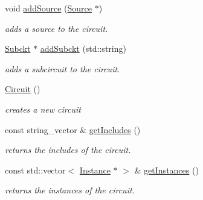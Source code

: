 \begin{DoxyCompactItemize}
void \mbox{\hyperlink{class_s_p_i_c_e_1_1_circuit_a627cf18c2763bb59f3d7e5142873251c}{add\+Source}} (\mbox{\hyperlink{class_s_p_i_c_e_1_1_source}{Source}} $\ast$)
\begin{DoxyCompactList}\small\item\em adds a source to the circuit. \end{DoxyCompactList}\item 
\mbox{\hyperlink{class_s_p_i_c_e_1_1_subckt}{Subckt}} $\ast$ \mbox{\hyperlink{class_s_p_i_c_e_1_1_circuit_a0d1352e46d4537ce1e5f651de40e91a6}{add\+Subckt}} (std\+::string)
\begin{DoxyCompactList}\small\item\em adds a subcircuit to the circuit. \end{DoxyCompactList}\item 
\mbox{\label{class_s_p_i_c_e_1_1_circuit_a2210ebc37eee536dbe9b44a89690256c}} 
\mbox{\hyperlink{class_s_p_i_c_e_1_1_circuit_a2210ebc37eee536dbe9b44a89690256c}{Circuit}} ()
\begin{DoxyCompactList}\small\item\em creates a new circuit \end{DoxyCompactList}\item 
\mbox{\label{class_s_p_i_c_e_1_1_circuit_a312beaf640e84589e6644820355c8ed6}} 
const string\+\_\+vector \& \mbox{\hyperlink{class_s_p_i_c_e_1_1_circuit_a312beaf640e84589e6644820355c8ed6}{get\+Includes}} ()
\begin{DoxyCompactList}\small\item\em returns the includes of the circuit. \end{DoxyCompactList}\item 
\mbox{\label{class_s_p_i_c_e_1_1_circuit_a8e6e58ffab876152a740092520c35d73}} 
const std\+::vector$<$ \mbox{\hyperlink{class_s_p_i_c_e_1_1_instance}{Instance}} $\ast$ $>$ \& \mbox{\hyperlink{class_s_p_i_c_e_1_1_circuit_a8e6e58ffab876152a740092520c35d73}{get\+Instances}} ()
\begin{DoxyCompactList}\small\item\em returns the instances of the circuit. \end{DoxyCompactList}\item 
\mbox{\label{class_s_p_i_c_e_1_1_circuit_a3e6a71a711e4796470f1a2a1dc42aef6}} 

\end{DoxyCompactItemize}
